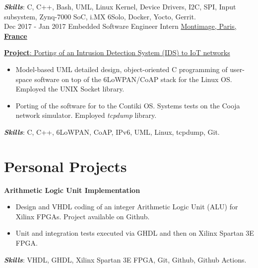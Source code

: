\documentclass[letterpaper]{twentysecondcv} %
\begin{document}
\begin{twenty}
{            \vspace{2 mm}
            \textbf{\textit{Skills}}: C, C++, Bash, UML, Linux Kernel, Device Drivers, I2C, SPI, Input subsystem, Zynq-7000 SoC, i.MX 6Solo, Docker, Yocto, Gerrit.
    }\\
    \twentyitem
        {Dec 2017 -}
        {Jan 2017}
        {Embedded Software Engineer Intern}
        {\href{https://www.montimage.com/}{Montimage, Paris, \textbf{France}}}
        {}
        {
            \vspace{2 mm}
            \underline{\textbf{Project}: Porting of an Intrusion Detection System (IDS) to IoT networks}

            \vspace{2 mm}
            \begin{itemize}
                \item Model-based UML detailed design, object-oriented C programming of user-space software on top of the 6LoWPAN/CoAP stack for the Linux OS. Employed the UNIX Socket library.
                \item Porting of the software for to the Contiki OS. Systems tests on the Cooja network simulator. Employed \textit{tcpdump} library.
            \end{itemize}

            \vspace{2 mm}
            \textbf{\textit{Skills}}: C, C++, 6LoWPAN, CoAP, IPv6, UML, Linux, tcpdump, Git.
        }
\end{twenty}

\section{Personal Projects}

\textbf{Arithmetic Logic Unit Implementation}

\begin{itemize}
    \item Design and VHDL coding of an integer Arithmetic Logic Unit (ALU) for Xilinx FPGAs. Project available on Github.
    \item Unit and integration tests executed via GHDL and then on Xilinx Spartan 3E FPGA.
\end{itemize}

\textbf{\textit{Skills}}: VHDL, GHDL, Xilinx Spartan 3E FPGA, Git, Github, Github Actions.
\end{document}
